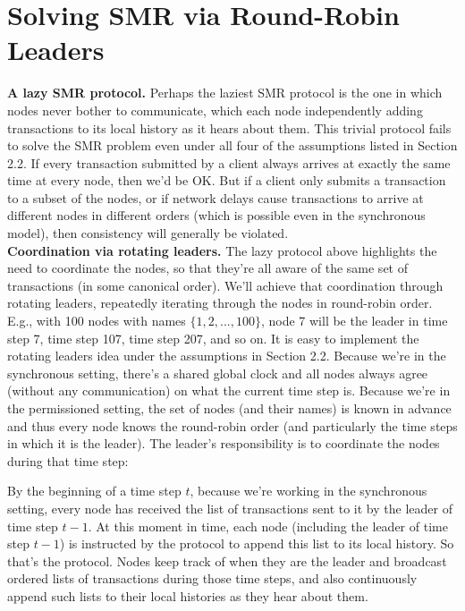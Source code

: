 \newpage
\section{Solving SMR via Round-Robin Leaders}
\noindent
\textbf{A lazy SMR protocol.} Perhaps the laziest SMR protocol is the one in which nodes
never bother to communicate, which each node independently adding transactions to its
local history as it hears about them. This trivial protocol fails to solve the SMR problem
even under all four of the assumptions listed in Section 2.2. If every transaction submitted by a client
always arrives at exactly the same time at every node, then we’d be OK. But if a client only
submits a transaction to a subset of the nodes, or if network delays cause transactions to
arrive at different nodes in different orders (which is possible even in the synchronous model),
then consistency will generally be violated.\\

\noindent
\textbf{Coordination via rotating leaders.} The lazy protocol above highlights the need to coordinate the nodes, so that they’re all aware of the same set of transactions (in some canonical
order). We’ll achieve that coordination through rotating leaders, repeatedly iterating through
the nodes in round-robin order. E.g., with 100 nodes with names $\{1, 2, . . . , 100\}$, node 7 will
be the leader in time step 7, time step 107, time step 207, and so on.
It is easy to implement the rotating leaders idea under the assumptions in Section 2.2.
Because we’re in the synchronous setting, there’s a shared global clock and all nodes always
agree (without any communication) on what the current time step is. Because we’re in the
permissioned setting, the set of nodes (and their names) is known in advance and thus every
node knows the round-robin order (and particularly the time steps in which it is the leader).
The leader’s responsibility is to coordinate the nodes during that time step:

By the beginning of a time step $t$, because we’re working in the synchronous setting, every
node has received the list of transactions sent to it by the leader of time step $t - 1$. At this
moment in time, each node (including the leader of time step $t - 1$) is instructed by the
protocol to append this list to its local history.
So that’s the protocol. Nodes keep track of when they are the leader and broadcast
ordered lists of transactions during those time steps, and also continuously append such lists
to their local histories as they hear about them.\\

